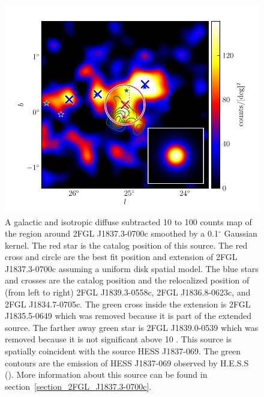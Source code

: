 \documentclass[12pt,preprint]{aastex}
\newcommand{\gev}{\text{GeV}\xspace}
\newcommand{\tev}{\text{TeV}\xspace}
\renewcommand{\deg}{\ensuremath{^\circ}\xspace}
\begin{document}
\begin{figure}
  \begin{center}
    \includegraphics[type=pdf,ext=.pdf,read=.pdf]{source_plots/source_1FGL_J1837.5-0659c}
  \end{center}
  \caption{
  A galactic and isotropic diffuse subtracted 10 \gev to 100 \gev
  counts map of the region around 2FGL J1837.3-0700c smoothed by a
  0.1\deg Gaussian kernel.  The red star is the catalog position of
  this source. The red cross and circle are the best fit position and
  extension  of 2FGL J1837.3-0700c assuming a uniform disk spatial model.
  The blue stars and crosses are the catalog position and the relocalized
  position of (from left to right) 2FGL J1839.3-0558c, 2FGL J1836.8-0623c,
  and 2FGL J1834.7-0705c.  The green cross inside the extension is 
  2FGL J1835.5-0649 which was removed because it
  is part of the extended source.  The farther away green star is 2FGL
  J1839.0-0539 which was removed because it is not significant above
  10 \gev.  This source is spatially coincident with the \tev source HESS
  J1837-069.  The green contours are the \tev emission of HESS J1837-069
  observed by H.E.S.S (\cite{HESS_plane_survey}).  More information about
  this source can be found in section~\ref{section_2FGL_J1837.3-0700c}.
  }\label{1FGL_J1837.5-0659c}
\end{figure}
\end{document}

